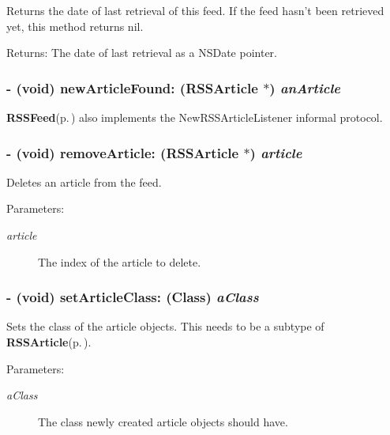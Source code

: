 Returns the date of last retrieval of this feed. If the feed hasn't been retrieved yet, this method returns nil.

\begin{Desc}
\item[Returns:]The date of last retrieval as a NSDate pointer. \end{Desc}
\subsubsection{\setlength{\rightskip}{0pt plus 5cm}- (void) new\-Article\-Found: ({\bf RSSArticle} $\ast$) {\em an\-Article}}\label{classRSSFeed_f3f84cc415099c96c1b138cc8d0aa285}


{\bf RSSFeed}{\rm (p.\,\pageref{classRSSFeed})} also implements the New\-RSSArticle\-Listener informal protocol. 
\subsubsection{\setlength{\rightskip}{0pt plus 5cm}- (void) remove\-Article: ({\bf RSSArticle} $\ast$) {\em article}}\label{classRSSFeed_29afdf6eb5be55fabfe9aed791194ed2}


Deletes an article from the feed.

\begin{Desc}
\item[Parameters:]
\begin{description}
\item[{\em article}]The index of the article to delete. \end{description}
\end{Desc}
\subsubsection{\setlength{\rightskip}{0pt plus 5cm}- (void) set\-Article\-Class: (Class) {\em a\-Class}}\label{classRSSFeed_88a649a3922cc4c629212bb6f53a716f}


Sets the class of the article objects. This needs to be a subtype of {\bf RSSArticle}{\rm (p.\,\pageref{interfaceRSSArticle})}.

\begin{Desc}
\item[Parameters:]
\begin{description}
\item[{\em a\-Class}]The class newly created article objects should have. \end{description}
\end{Desc}
